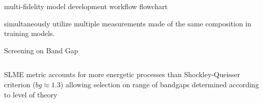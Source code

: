 \documentclass[10pt, aspectratio=169, presentation]{beamer}
\begin{document}
\begin{frame}[label={sec:orgb6295f1}]{multi-fidelity model development workflow}
\alert{flowchart}

simultaneously utilize multiple measurements made of the same
composition in training models.\autocite{manganaris-2022-mrs-comput}
\end{frame}

\begin{frame}[label={sec:org0897ce6}]{Screening on Band Gap}
\begin{columns}
\begin{column}{0.5\columnwidth}
 
\begin{center}

\end{center}
\end{column}

\begin{column}{0.5\columnwidth}
 
\begin{center}

\end{center}
\end{column}
\end{columns}

SLME metric accounts for more energetic processes than
Shockley-Queisser criterion (\(bg \approx 1.3\)) allowing selection on range
of bandgaps determined according to level of theory\autocite[p.1]{yu-2012-ident-poten}
\end{frame}
\end{document}
